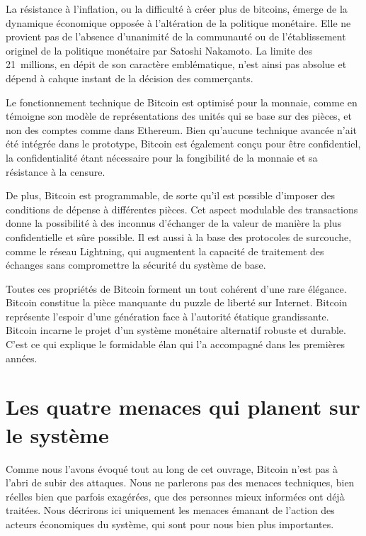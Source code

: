 La résistance à l'inflation, ou la difficulté à créer plus de bitcoins, émerge de la dynamique économique opposée à l'altération de la politique monétaire. Elle ne provient pas de l'absence d'unanimité de la communauté ou de l'établissement originel de la politique monétaire par Satoshi Nakamoto. La limite des 21~millions, en dépit de son caractère emblématique, n'est ainsi pas absolue et dépend à cahque instant de la décision des commerçants.

Le fonctionnement technique de Bitcoin est optimisé pour la monnaie, comme en témoigne son modèle de représentations des unités qui se base sur des pièces, et non des comptes comme dans Ethereum. Bien qu'aucune technique avancée n'ait été intégrée dans le prototype, Bitcoin est également conçu pour être confidentiel, la confidentialité étant nécessaire pour la fongibilité de la monnaie et sa résistance à la censure.

De plus, Bitcoin est programmable, de sorte qu'il est possible d'imposer des conditions de dépense à différentes pièces. Cet aspect modulable des transactions donne la possibilité à des inconnus d'échanger de la valeur de manière la plus confidentielle et sûre possible. Il est aussi à la base des protocoles de surcouche, comme le réseau Lightning, qui augmentent la capacité de traitement des échanges sans compromettre la sécurité du système de base.

Toutes ces propriétés de Bitcoin forment un tout cohérent d'une rare élégance. Bitcoin constitue la pièce manquante du puzzle de liberté sur Internet. Bitcoin représente l'espoir d'une génération face à l'autorité étatique grandissante. Bitcoin incarne le projet d'un système monétaire alternatif robuste et durable. C'est ce qui explique le formidable élan qui l'a accompagné dans les premières années.


\section*{Les quatre menaces qui planent sur le système}

Comme nous l'avons évoqué tout au long de cet ouvrage, Bitcoin n'est pas à l'abri de subir des attaques. Nous ne parlerons pas des menaces techniques, bien réelles bien que parfois exagérées, que des personnes mieux informées ont déjà traitées. Nous décrirons ici uniquement les menaces émanant de l'action des acteurs économiques du système, qui sont pour nous bien plus importantes.

